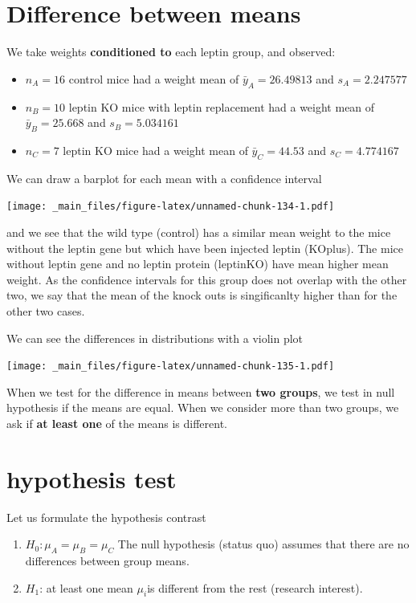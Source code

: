 \documentclass[
]{book}
\begin{document}
\hypertarget{difference-between-means-2}{%
\section{Difference between means}\label{difference-between-means-2}}

We take weights \textbf{conditioned to} each leptin group, and observed:

\begin{itemize}
\item
  \(n_A=16\) control mice had a weight mean of \(\bar{y}_A=26.49813\) and \(s_A=2.247577\)
\item
  \(n_B=10\) leptin KO mice with leptin replacement had a weight mean of \(\bar{y}_B=25.668\) and \(s_B=5.034161\)
\item
  \(n_C=7\) leptin KO mice had a weight mean of \(\bar{y}_C=44.53\) and \(s_C=4.774167\)
\end{itemize}

We can draw a barplot for each mean with a confidence interval

\texttt{[image: \_main\_files/figure-latex/unnamed-chunk-134-1.pdf]}

and we see that the wild type (control) has a similar mean weight to the mice without the leptin gene but which have been injected leptin (KOplus). The mice without leptin gene and no leptin protein (leptinKO) have mean higher mean weight. As the confidence intervals for this group does not overlap with the other two, we say that the mean of the knock outs is singificanlty higher than for the other two cases.

We can see the differences in distributions with a violin plot

\texttt{[image: \_main\_files/figure-latex/unnamed-chunk-135-1.pdf]}

When we test for the difference in means between \textbf{two groups}, we test in null hypothesis if the means are equal. When we consider more than two groups, we ask if \textbf{at least one} of the means is different.

\hypertarget{hypothesis-test-2}{%
\section{hypothesis test}\label{hypothesis-test-2}}

Let us formulate the hypothesis contrast

\begin{enumerate}
\def\labelenumi{\alph{enumi}.}
\item
  \(H_0: \mu_A=\mu_B=\mu_C\) The null hypothesis (status quo) assumes that there are no differences between group means.
\item
  \(H_1\): at least one mean \(\mu_i\)is different from the rest (research interest).
\end{enumerate}
\end{document}
